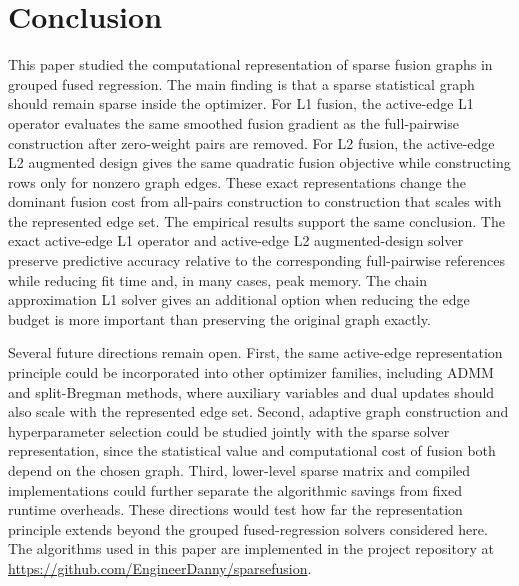 \documentclass[twoside,11pt]{article}
\begin{document}
\section{Conclusion}
This paper studied the computational representation of sparse fusion graphs in grouped fused regression. 
The main finding is that a sparse statistical graph should remain sparse inside the optimizer. 
For L1 fusion, the active-edge L1 operator evaluates the same smoothed fusion gradient as the full-pairwise construction after zero-weight pairs are removed. 
For L2 fusion, the active-edge L2 augmented design gives the same quadratic fusion objective while constructing rows only for nonzero graph edges. 
These exact representations change the dominant fusion cost from all-pairs construction to construction that scales with the represented edge set.
The empirical results support the same conclusion. 
The exact active-edge L1 operator and active-edge L2 augmented-design solver preserve predictive accuracy relative to the corresponding full-pairwise references while reducing fit time and, in many cases, peak memory. 
The chain approximation L1 solver gives an additional option when reducing the edge budget is more important than preserving the original graph exactly. 

Several future directions remain open. 
First, the same active-edge representation principle could be incorporated into other optimizer families, including ADMM and split-Bregman methods, where auxiliary variables and dual updates should also scale with the represented edge set. 
Second, adaptive graph construction and hyperparameter selection could be studied jointly with the sparse solver representation, since the statistical value and computational cost of fusion both depend on the chosen graph. 
Third, lower-level sparse matrix and compiled implementations could further separate the algorithmic savings from fixed runtime overheads. 
These directions would test how far the representation principle extends beyond the grouped fused-regression solvers considered here.
The algorithms used in this paper are implemented in the project repository at \url{https://github.com/EngineerDanny/sparsefusion}.



\end{document}
